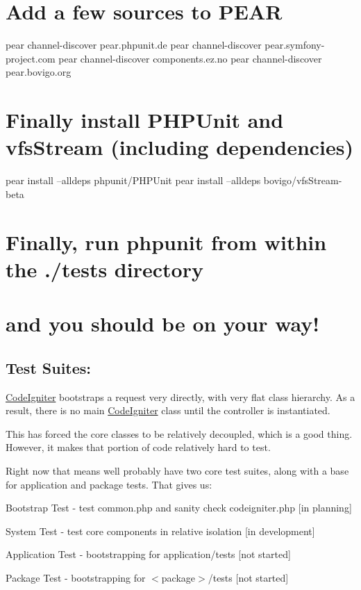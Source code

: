 \section*{Add a few sources to P\+E\+A\+R}

pear channel-\/discover pear.\+phpunit.\+de pear channel-\/discover pear.\+symfony-\/project.\+com pear channel-\/discover components.\+ez.\+no pear channel-\/discover pear.\+bovigo.\+org

\section*{Finally install P\+H\+P\+Unit and vfs\+Stream (including dependencies)}

pear install --alldeps phpunit/\+P\+H\+P\+Unit pear install --alldeps bovigo/vfs\+Stream-\/beta

\section*{Finally, run \textquotesingle{}phpunit\textquotesingle{} from within the ./tests directory}

\section*{and you should be on your way!}

\subsection*{Test Suites\+:}

\hyperlink{namespace_code_igniter}{Code\+Igniter} bootstraps a request very directly, with very flat class hierarchy. As a result, there is no main \hyperlink{namespace_code_igniter}{Code\+Igniter} class until the controller is instantiated.

This has forced the core classes to be relatively decoupled, which is a good thing. However, it makes that portion of code relatively hard to test.

Right now that means we\textquotesingle{}ll probably have two core test suites, along with a base for application and package tests. That gives us\+:


\begin{DoxyEnumerate}
\item Bootstrap Test -\/ test common.\+php and sanity check codeigniter.\+php \mbox{[}in planning\mbox{]}
\item System Test -\/ test core components in relative isolation \mbox{[}in development\mbox{]}
\item Application Test -\/ bootstrapping for application/tests \mbox{[}not started\mbox{]}
\item Package Test -\/ bootstrapping for $<$package$>$/tests \mbox{[}not started\mbox{]}
\end{DoxyEnumerate}

